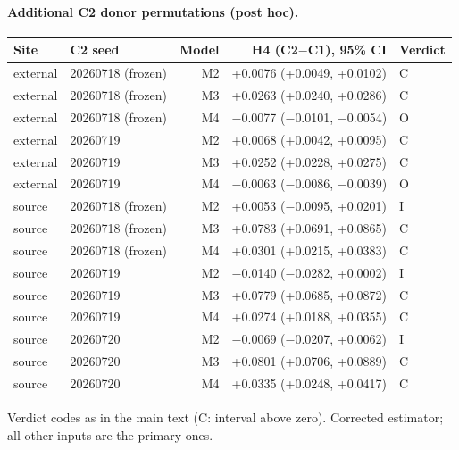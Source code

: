 \paragraph{Additional C2 donor permutations (post hoc).}
\begin{center}\small\begin{tabular}{llrrl}
\toprule
Site & C2 seed & Model & H4 (C2$-$C1), 95\% CI & Verdict\\
\midrule
external & 20260718 (frozen) & M2 & +0.0076 (+0.0049, +0.0102) & C\\
external & 20260718 (frozen) & M3 & +0.0263 (+0.0240, +0.0286) & C\\
external & 20260718 (frozen) & M4 & $-$0.0077 ($-$0.0101, $-$0.0054) & O\\
external & 20260719 & M2 & +0.0068 (+0.0042, +0.0095) & C\\
external & 20260719 & M3 & +0.0252 (+0.0228, +0.0275) & C\\
external & 20260719 & M4 & $-$0.0063 ($-$0.0086, $-$0.0039) & O\\
source & 20260718 (frozen) & M2 & +0.0053 ($-$0.0095, +0.0201) & I\\
source & 20260718 (frozen) & M3 & +0.0783 (+0.0691, +0.0865) & C\\
source & 20260718 (frozen) & M4 & +0.0301 (+0.0215, +0.0383) & C\\
source & 20260719 & M2 & $-$0.0140 ($-$0.0282, +0.0002) & I\\
source & 20260719 & M3 & +0.0779 (+0.0685, +0.0872) & C\\
source & 20260719 & M4 & +0.0274 (+0.0188, +0.0355) & C\\
source & 20260720 & M2 & $-$0.0069 ($-$0.0207, +0.0062) & I\\
source & 20260720 & M3 & +0.0801 (+0.0706, +0.0889) & C\\
source & 20260720 & M4 & +0.0335 (+0.0248, +0.0417) & C\\
\bottomrule
\end{tabular}\end{center}
Verdict codes as in the main text (C: interval above zero). Corrected estimator; all other inputs are the primary ones.
